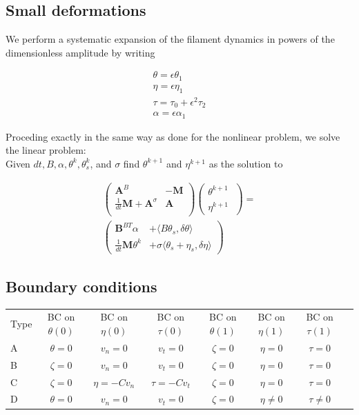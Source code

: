 \documentclass[12pt]{article}
\newcommand{\vv}[1]{\boldsymbol{#1}}
\begin{document}
\subsection{Small deformations}\label{small-deformations}

We perform a systematic expansion of the filament dynamics in powers of the dimensionless amplitude \epsilon by writing

$$
\begin{aligned}
\theta = \epsilon\theta_1 \\
\eta = \epsilon\eta_1 \\
\tau = \tau_0 + \epsilon^2 \tau_2 \\
\alpha = \epsilon \alpha_1
\end{aligned}
$$

Proceding exactly in the same way as done for the nonlinear problem, we solve the linear problem:\\
Given $dt, B, \alpha, \theta^k, \theta^k_s$, and $\sigma$ find
$\theta^{k+1}$ and $\eta^{k+1}$ as the solution to

\begin{multline}

\begin{pmatrix}
\vv A^B &  -\vv M  \\
\frac{1}{dt} \vv M + \vv A^\sigma & \vv A \\
\end{pmatrix}
%
\begin{pmatrix}
\theta^{k+1}\phantom{\big|\!\!}\\
\eta^{k+1}\phantom{\big|\!\!} 
\end{pmatrix}
=\\
\begin{pmatrix}
\vv B^{BT}\alpha & +\langle B\theta_s, \delta \theta\rangle\\
\frac{1}{dt} \vv M \theta^k& +\sigma \langle \theta_s+\eta_s,\delta\eta\rangle
\end{pmatrix}
\end{multline}


\subsection{Boundary conditions}\label{boundary-conditions}

\begin{tabular}{l|c|c|c|c||c|c|c|}
  Type & BC on $\theta(0)$ & BC on $\eta(0)$ & BC on $\tau(0)$ & BC on $\theta(1)$ & BC on $\eta(1)$ & BC on $\tau(1)$ \\
  A & $\theta = 0$ & $v_n = 0$ & $v_t=0$ & $\zeta = 0$ &  $\eta = 0$& $\tau = 0$  \\
  B & $\zeta = 0$ & $v_n = 0$ & $v_t=0$  & $\zeta = 0$&  $\eta = 0$& $\tau = 0$ \\
  C &  $\zeta = 0$ & $\eta = -C v_n$& $\tau =  -C v_t$ & $\zeta = 0$&  $\eta = 0$& $\tau = 0$ \\
  D  &  $\theta = 0$ & $v_n = 0$& $v_t=0$ & $\zeta = 0$& $\eta \neq 0$& $\tau \neq 0$ 
\end{tabular}
\end{document}

